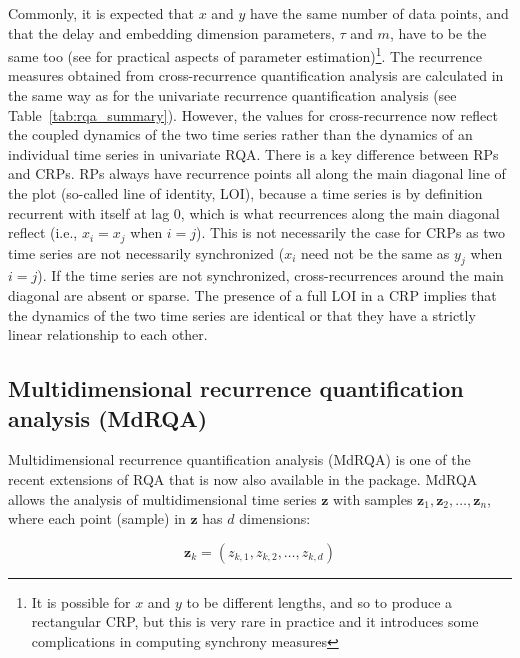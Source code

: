 Commonly, it is expected that $x$ and $y$ have the same number of data points, and that the delay and embedding dimension parameters, $\tau$ and $m$, have to be the same too (see \cite{wallot2018calculation,wallot2018analyzing} for practical aspects of parameter estimation)\footnote{It is possible for $x$ and $y$ to be different lengths, and so to produce a rectangular CRP, but this is very rare in practice and it introduces some complications in computing synchrony measures}. The recurrence measures obtained from cross-recurrence quantification analysis are calculated in the same way as for the univariate recurrence quantification analysis (see Table~\ref{tab:rqa_summary}). However, the values for cross-recurrence now reflect the coupled dynamics of the two time series \citep{Shockley2002coupled} rather than the dynamics of an individual time series in univariate RQA.
There is a key difference between RPs and CRPs. RPs always have recurrence points all along the main diagonal line of the plot (so-called line of identity, LOI), because a time series is by definition recurrent with itself at lag 0, which is what recurrences along the main diagonal reflect (i.e., $x_i=x_j$ when $i=j$). This is not necessarily the case for CRPs as two time series are not necessarily synchronized ($x_i$ need not be the same as $y_j$ when $i=j$). If the time series are not synchronized, cross-recurrences around the main diagonal are absent or sparse. The presence of a full LOI in a CRP implies that the dynamics of the two time series are identical or that they have a strictly linear relationship to each other.

\subsection{Multidimensional recurrence quantification analysis (MdRQA)}
\label{sec:mdrqa}

Multidimensional recurrence quantification analysis (MdRQA) is one of the recent extensions of RQA  \citep{wallot2016multidimensional} that is now also available in the  package. MdRQA allows the analysis of multidimensional time series $\mathbf{z}$ with samples $\mathbf{z}_1, \mathbf{z}_2, \ldots , \mathbf{z}_n$, where each point (sample) in $\mathbf{z}$ has $d$ dimensions:

\begin{equation}
    \mathbf{z}_k = (z_{k,1}, z_{k,2}, \ldots , z_{k,d}) 
\end{equation}

